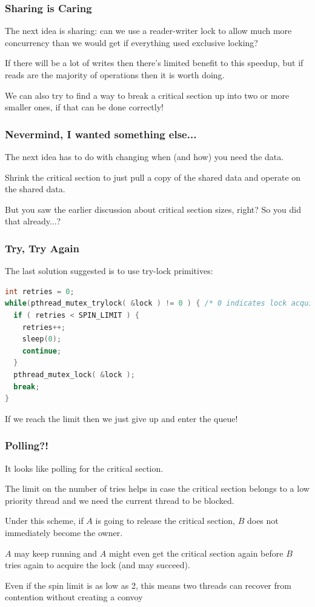 \begin{frame}
\frametitle{Sharing is Caring}

The next idea is sharing: can we use a reader-writer lock to allow much more concurrency than we would get if everything used exclusive locking? 

If there will be a lot of writes then there's limited benefit to this speedup, but if reads are the majority of operations then it is worth doing. 

We can also try to find a way to break a critical section up into two or more smaller ones, if that can be done correctly!

\end{frame}

\begin{frame}
\frametitle{Nevermind, I wanted something else...}

The next idea has to do with changing when (and how) you need the data. 

Shrink the critical section to just pull a copy of the shared data and operate on the shared data. 
 
 
But you saw the earlier discussion about critical section sizes, right? So you did that already...?


\end{frame} 


\begin{frame}[fragile]
\frametitle{Try, Try Again}

The last solution suggested is to use try-lock primitives:

\begin{lstlisting}[language=C]
int retries = 0;
while(pthread_mutex_trylock( &lock ) != 0 ) { /* 0 indicates lock acquired */
  if ( retries < SPIN_LIMIT ) {
    retries++;
    sleep(0);
    continue;
  }
  pthread_mutex_lock( &lock );
  break;
}
\end{lstlisting}

If we reach the limit then we just give up and enter the queue!

\end{frame}



\begin{frame}
\frametitle{Polling?!}

It looks like polling for the critical section. 

The limit on the number of tries helps in case the critical section belongs to a low priority thread and we need the current thread to be blocked.

Under this scheme, if $A$ is going to release the critical section, $B$ does not immediately become the owner. 

$A$ may keep running and $A$ might even get the critical section again before $B$ tries again to acquire the lock (and may succeed). 

Even if the spin limit is as low as 2, this means two threads can recover from contention without creating a convoy

\end{frame}


